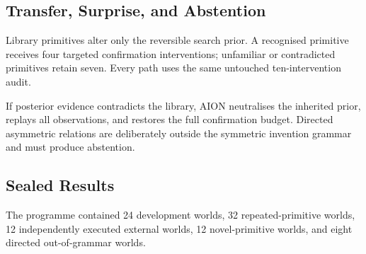 \subsection{Transfer, Surprise, and Abstention}

Library primitives alter only the reversible search prior. A recognised
primitive receives four targeted confirmation interventions; unfamiliar or
contradicted primitives retain seven. Every path uses the same untouched
ten-intervention audit.

If posterior evidence contradicts the library, AION neutralises the inherited
prior, replays all observations, and restores the full confirmation budget.
Directed asymmetric relations are deliberately outside the symmetric invention
grammar and must produce abstention.

\subsection{Sealed Results}

The programme contained 24 development worlds, 32 repeated-primitive worlds,
12 independently executed external worlds, 12 novel-primitive worlds, and
eight directed out-of-grammar worlds.


